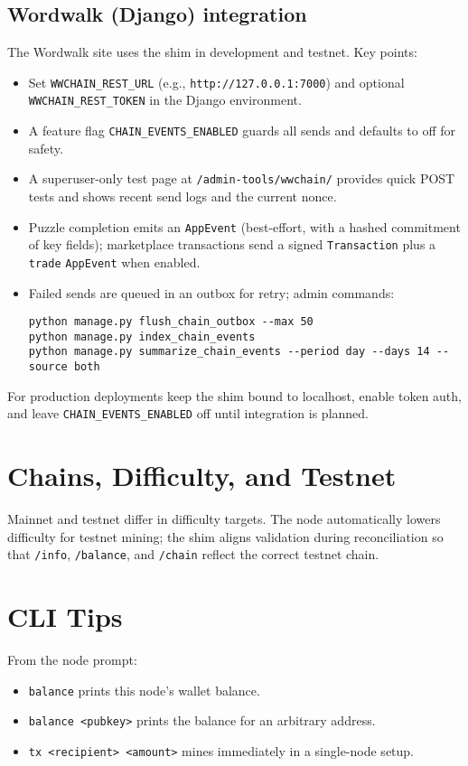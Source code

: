 \subsection{Wordwalk (Django) integration}
The Wordwalk site uses the shim in development and testnet. Key points:
\begin{itemize}
\item Set \texttt{WWCHAIN\_REST\_URL} (e.g., \texttt{http://127.0.0.1:7000}) and optional \texttt{WWCHAIN\_REST\_TOKEN} in the Django environment.
\item A feature flag \texttt{CHAIN\_EVENTS\_ENABLED} guards all sends and defaults to off for safety.
\item A superuser-only test page at \texttt{/admin-tools/wwchain/} provides quick POST tests and shows recent send logs and the current nonce.
\item Puzzle completion emits an \texttt{AppEvent} (best-effort, with a hashed commitment of key fields); marketplace transactions send a signed \texttt{Transaction} plus a \texttt{trade} \texttt{AppEvent} when enabled.
\item Failed sends are queued in an outbox for retry; admin commands:
\begin{verbatim}
python manage.py flush_chain_outbox --max 50
python manage.py index_chain_events
python manage.py summarize_chain_events --period day --days 14 --source both
\end{verbatim}
\end{itemize}

For production deployments keep the shim bound to localhost, enable token auth, and leave \texttt{CHAIN\_EVENTS\_ENABLED} off until integration is planned.

\section{Chains, Difficulty, and Testnet}
Mainnet and testnet differ in difficulty targets. The node automatically lowers difficulty for testnet mining; the shim aligns validation during reconciliation so that \texttt{/info}, \texttt{/balance}, and \texttt{/chain} reflect the correct testnet chain.

\section{CLI Tips}
From the node prompt:
\begin{itemize}
\item \texttt{balance} prints this node's wallet balance.
\item \texttt{balance <pubkey>} prints the balance for an arbitrary address.
\item \texttt{tx <recipient> <amount>} mines immediately in a single-node setup.
\end{itemize}
